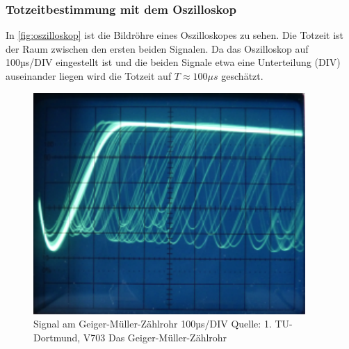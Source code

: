 \subsubsection{Totzeitbestimmung mit dem Oszilloskop}
\label{sec:totzeitO}
In \autoref{fig:oszilloskop} ist die Bildröhre eines Oszilloskopes zu sehen. Die Totzeit ist der Raum 
zwischen den ersten beiden Signalen. Da das Oszilloskop auf 100µs/DIV eingestellt ist und die beiden Signale 
etwa eine Unterteilung (DIV) auseinander liegen wird die Totzeit auf $T \approx 100\mu s$ geschätzt.
\begin{figure}
  \centering
  \includegraphics{oszilloskop.pdf}
  \caption{Signal am Geiger-Müller-Zählrohr 100µs/DIV Quelle: 1. TU-Dortmund, V703 Das Geiger-Müller-Zählrohr}
  \label{fig:oszilloskop}
\end{figure}

